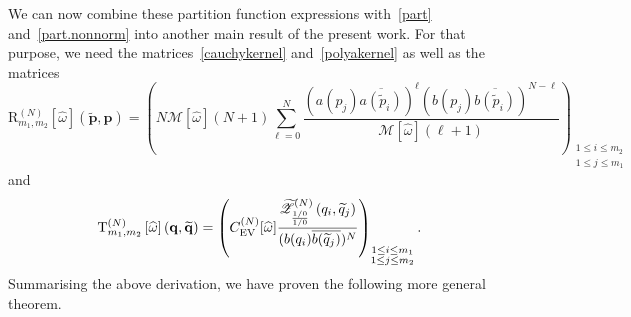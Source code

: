 \documentclass[pdflatex,sn-mathphys-num]{sn-jnl}
\theoremstyle{thmstyleone}
\numberwithin{equation}{section}
\begin{document}
We can now combine these partition function expressions with~\eqref{part} and~\eqref{part.nonnorm} into another main result of the present work. For that purpose, we need the matrices~\eqref{cauchykernel} and~\eqref{polyakernel} as well as the matrices
\begin{equation}
    \mathrm{R}^{\left ( N \right )}_{m_{1},m_{2}}\left [ \widehat{\omega} \right ]\left ( \widetilde{\mathbf{p}},\mathbf{p} \right ) =\left(N\mathcal{M}[\widehat{\omega}](N+1)\sum\limits_{\ell=0}^{N}\frac{\left ( a\left(p_{j}\right)\overline{a\left(\widetilde{p}_{i}\right)} \right )^{\ell}\left ( b\left(p_{j}\right)\overline{b\left(\widetilde{p}_{i}\right)} \right )^{N-\ell}}{\mathcal{M}\left [ \widehat{\omega} \right ]\left ( \ell+1 \right )}\right)_{\substack{1\leq i\leq m_2\\1\leq j\leq m_1}}
\end{equation}
and
\begin{equation}
    \mathrm{T}^{\left ( N \right )}_{m_{1},m_{2}}\left [ \widehat{\omega} \right ]\left ( \mathbf{q},\widetilde{\mathbf{q}} \right ) =\left(C_{\rm EV}^{(N)}[\widehat{\omega}]\frac{\widetilde{\mathscr{Z}}^{\left ( N \right )}_{\frac{1/0}{1/0}}\left ( q_{i},\widetilde{q}_{j} \right )}{(b(q_i)\overline{b(\widetilde{q}_j)})^N}\right)_{\substack{1\leq i\leq m_1\\1\leq j\leq m_2}}.
\end{equation}
Summarising the above derivation, we have proven the following more general theorem.
\end{document}
